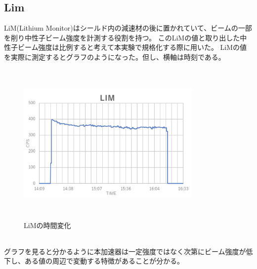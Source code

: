\subsection{Lim}
LiM(Lithium Monitor)はシールド内の減速材の後に置かれていて、ビームの一部を削り中性子ビーム強度を計測する役割を持つ。
このLiMの値と取り出した中性子ビーム強度は比例すると考えて本実験で規格化する際に用いた。
LiMの値を実際に測定するとグラフのようになった。但し、横軸は時刻である。
\begin{figure}[h]
\centering
\includegraphics[width=9cm,height=8cm]{accelerator/LiM.pdf}\caption{LiMの時間変化}
\end{figure}\\
グラフを見ると分かるように本加速器は一定強度ではなく次第にビーム強度が低下し、ある値の周辺で変動する特徴があることが分かる。




